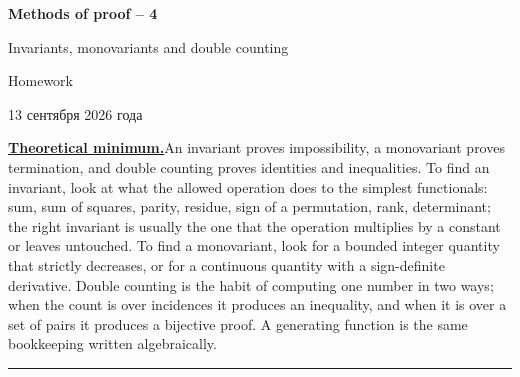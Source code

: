 \documentclass[11pt,a4paper]{article}
\begin{document}
\begin{center}
{\huge\bfseries Methods of proof -- 4\par}\vspace{1.1em}
{\Large Invariants, monovariants and double counting\par}\vspace{1.1em}
{\Large Homework\par}\vspace{1.1em}
{\foreignlanguage{russian}{13 сентября 2026 года}\par}
\end{center}\vspace{0.0pt}

\noindent\textbf{\underline{Theoretical minimum.}}\quad An invariant proves impossibility, a
monovariant proves termination, and double counting proves identities and inequalities. To find an
invariant, look at what the allowed operation does to the simplest functionals: sum, sum of
squares, parity, residue, sign of a permutation, rank, determinant; the right invariant is usually
the one that the operation multiplies by a constant or leaves untouched. To find a monovariant,
look for a bounded integer quantity that strictly decreases, or for a continuous quantity with a
sign-definite derivative. Double counting is the habit of computing one number in two ways; when
the count is over incidences it produces an inequality, and when it is over a set of pairs it
produces a bijective proof. A generating function is the same bookkeeping written algebraically.

\medskip
\noindent\rule{\textwidth}{0.4pt}
\end{document}
